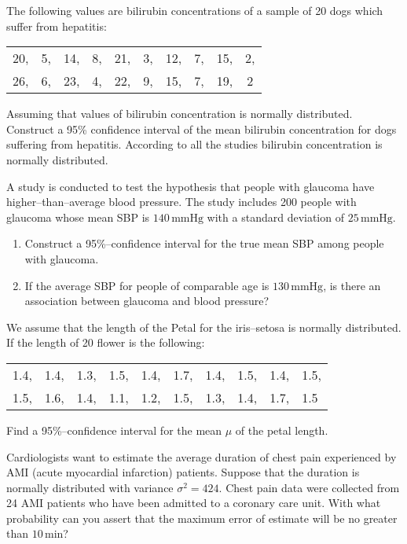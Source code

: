 \begin{problem}
  The following values are bilirubin concentrations of a sample of 20
  dogs which suffer from hepatitis: 
  \begin{center}
    \begin{tabular}{*{10}{c}}    
20, & 5, & 14, & 8, & 21, & 3, & 12, & 7, & 15, & 2, \\ 
26,&6,&23,&4,&22,&9,&15,&7,&19,&2 
  \end{tabular}
  \end{center}
  
Assuming that values of bilirubin concentration is normally
distributed. Construct a 95\% confidence interval of the mean
bilirubin concentration for dogs suffering from hepatitis. According
to all the studies bilirubin concentration is normally distributed.
\end{problem}
\begin{problem}%
  A study is conducted to test the hypothesis that people with glaucoma
  have higher--than--average blood pressure. The study includes 200
  people  with glaucoma whose mean SBP is $140\,\textrm{mmHg}$ with a
  standard deviation of $25\,\textrm{mmHg}$.
  \begin{enumerate}
  \item Construct a 95\%--confidence interval for the true mean SBP
    among people with glaucoma.
  \item If the average SBP for people of comparable age is
    $130\,\textrm{mmHg}$, is there an association between glaucoma
    and blood pressure?
  \end{enumerate}
\end{problem}
\begin{problem}
  We assume that the length  of the Petal for the iris--setosa is
  normally distributed. If the length of 20 flower is the following:
\begin{center}
   \begin{tabular}{*{10}{l}}
    1.4, & 1.4, & 1.3, & 1.5, & 1.4, & 1.7, & 1.4, & 1.5, & 1.4, &
    1.5, \\
 1.5, & 1.6, & 1.4, & 1.1, & 1.2, & 1.5, & 1.3, & 1.4, & 1.7, & 1.5
  \end{tabular}
\end{center}
Find a 95\%--confidence interval for the mean $\mu$ of the petal
length.
\end{problem}
\begin{problem} %
  Cardiologists want to estimate the average duration of chest pain experienced by AMI (acute myocardial infarction) patients. Suppose that the duration is normally distributed with variance $\sigma^2 = 424$. Chest pain data were collected from 24 AMI patients who have been admitted to a coronary care unit. With what probability can you assert that the maximum error of estimate will be no greater than $10\,\textrm{min}$?
\end{problem}



